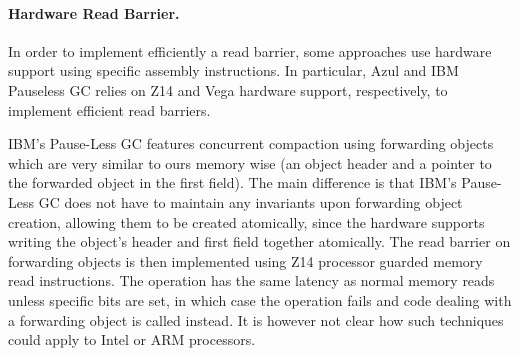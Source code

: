 \documentclass[sigplan,10pt,review,anonymous]{acmart}\settopmatter{printfolios=true,printccs=false,printacmref=false}
\begin{document}
\paragraph{Hardware Read Barrier.} 
In order to implement efficiently a read barrier, some approaches use hardware support using specific assembly instructions. In particular, Azul and IBM Pauseless GC \cite{AzulHardwareReadBarrierConcCompact,IBMConcCompact} relies on Z14 and Vega hardware support, respectively, to implement efficient read barriers.


IBM's Pause-Less GC \cite{IBMConcCompact} features concurrent compaction using forwarding objects which are very similar to ours memory wise (an object header and a pointer to the forwarded object in the first field). The main difference is that IBM's Pause-Less GC does not have to maintain any invariants upon forwarding object creation, allowing them to be created atomically, since the hardware supports writing the object's header and first field together atomically. The read barrier on forwarding objects is then implemented using Z14 processor guarded memory read instructions. The operation has the same latency as normal memory reads unless specific bits are set, in which case the operation fails and code dealing with a forwarding object is called instead. It is however not clear how such techniques could apply to Intel or ARM processors.
\end{document}

